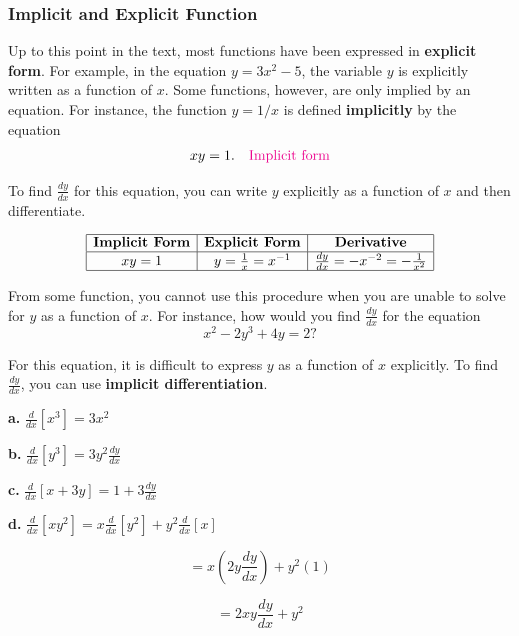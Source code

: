 \documentclass[12pt]{article}
\theoremstyle{beautifulthm}
\begin{document}
\subsubsection{Implicit and Explicit Function}
Up to this point in the text, most functions have been expressed in \textbf{explicit form}. For example, in the equation \(y = 3x^2 - 5\), the variable \(y\) is explicitly written as a function of \(x\). Some functions, however, are only implied by an equation. For instance, the function \(y = 1/x\) is defined \textbf{implicitly} by the equation
\[
xy = 1. \quad \textcolor{magenta}{\text{Implicit form}}
\]

To find \(\frac{dy}{dx}\) for this equation, you can write \(y\) explicitly as a function of \(x\) and then differentiate.

\[
\begin{array}{|c|c|c|}
\hline
\textbf{Implicit Form} & \textbf{Explicit Form} & \textbf{Derivative} \\
\hline
xy = 1 & y = \frac{1}{x} = x^{-1} & \frac{dy}{dx} = -x^{-2} = -\frac{1}{x^2} \\
\hline
\end{array}
\]

From some function, you cannot use this procedure when you are unable to solve for \(y\) as a function of \(x\). For instance, how would you find \(\frac{dy}{dx}\) for the equation
\[
x^2 - 2y^3 + 4y = 2?
\]

For this equation, it is difficult to express \(y\) as a function of \(x\) explicitly. To find \(\frac{dy}{dx}\), you can use \textbf{implicit differentiation}.
\begin{tcolorbox}[colback=examplebg, colframe=red!75!black, title=\textbf{EXAMPLE 1 : Differentiating with Respect to x}, fonttitle=\bfseries, sharp corners]

\noindent
\textbf{a.} \quad \(\frac{d}{dx}\left[x^3\right] = 3x^2\)



\vspace{0.5cm}

\noindent
\textbf{b.} \quad \(\frac{d}{dx}\left[y^3\right] = 3y^2 \frac{dy}{dx}\)



\vspace{0.5cm}

\noindent
\textbf{c.} \quad \(\frac{d}{dx}\left[x + 3y\right] = 1 + 3\frac{dy}{dx}\)


\vspace{0.5cm}

\noindent
\textbf{d.} \quad \(\frac{d}{dx}\left[xy^2\right] = x \frac{d}{dx}\left[y^2\right] + y^2 \frac{d}{dx}[x]\)



\[
= x\left(2y \frac{dy}{dx}\right) + y^2(1)
\]

\[
= 2xy \frac{dy}{dx} + y^2
\]

\end{tcolorbox}
\end{document}
